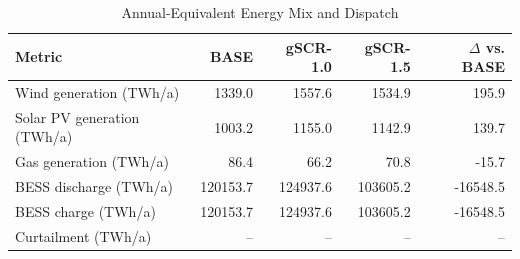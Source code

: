 \begin{table}[!t]
\centering
\caption{Annual-Equivalent Energy Mix and Dispatch}
\label{tab:energy_mix}
\renewcommand{\arraystretch}{1.08}
\begin{tabular}{lrrrr}
\toprule
Metric & BASE & gSCR-1.0 & gSCR-1.5 & \(\Delta\) vs. BASE \\
\midrule
Wind generation (TWh/a)        & 1339.0 & 1557.6 & 1534.9 & 195.9 \\
Solar PV generation (TWh/a)    & 1003.2 & 1155.0 & 1142.9 & 139.7 \\
Gas generation (TWh/a)         & 86.4 & 66.2 & 70.8 & -15.7 \\
BESS discharge (TWh/a)         & 120153.7 & 124937.6 & 103605.2 & -16548.5 \\
BESS charge (TWh/a)            & 120153.7 & 124937.6 & 103605.2 & -16548.5 \\
Curtailment (TWh/a)            & -- & -- & -- & -- \\
\bottomrule
\end{tabular}
\end{table}
